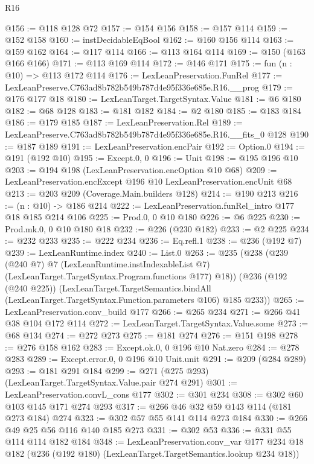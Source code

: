 \begin{lexlean}{R16}
\begin{coremodule}
@156 := @118 @128 @72
@157 := @154 @156
@158 := @157 @114
@159 := @152 @158
@160 := instDecidableEqBool
@162 := @160 @156 @114
@163 := @159 @162
@164 := @117 @114
@166 := @113 @164 @114
@169 := @150 (@163 @166 @166)
@171 := @113 @169 @114
@172 := @146 @171
@175 := fun (n : @10) => @113 @172 @114
@176 := LexLeanPreservation.FunRel
@177 := LexLeanPreserve.C763ad8b782b549b787d4e95f336e685e.R16.__prog
@179 := @176 @177 @18
@180 := LexLeanTarget.TargetSyntax.Value
@181 := @6 @180
@182 := @68 @128
@183 := @181 @182
@184 := @2 @180
@185 := @183 @184
@186 := @179 @185
@187 := LexLeanPreservation.Rel
@189 := LexLeanPreserve.C763ad8b782b549b787d4e95f336e685e.R16.__fits_0 @128
@190 := @187 @189
@191 := LexLeanPreservation.encPair
@192 := Option.{0}
@194 := @191 (@192 @10)
@195 := Except.{0, 0}
@196 := Unit
@198 := @195 @196 @10
@203 := @194 @198 (LexLeanPreservation.encOption @10 @68)
@209 := LexLeanPreservation.encExcept @196 @10 LexLeanPreservation.encUnit @68
@213 := @203 @209 (Coverage.Main.builders @128)
@214 := @190 @213
@216 := (n : @10) -> @186 @214
@222 := LexLeanPreservation.funRel_intro @177 @18 @185 @214 @106
@225 := Prod.{0, 0} @10 @180
@226 := @6 @225
@230 := Prod.mk.{0, 0} @10 @180 @18
@232 := @226 (@230 @182)
@233 := @2 @225
@234 := @232 @233
@235 := @222 @234
@236 := Eq.refl.{1}
@238 := @236 (@192 @7)
@239 := LexLeanRuntime.index
@240 := List.{0}
@263 := @235
    (@238
      (@239
        (@240 @7)
        @7
        (LexLeanRuntime.instIndexableList @7)
        (LexLeanTarget.TargetSyntax.Program.functions @177)
        @18))
    (@236
      (@192 (@240 @225))
      (LexLeanTarget.TargetSemantics.bindAll
        (LexLeanTarget.TargetSyntax.Function.parameters @106)
        @185
        @233))
@265 := LexLeanPreservation.conv_build @177
@266 := @265 @234
@271 := @266 @41 @38 @104 @172 @114
@272 := LexLeanTarget.TargetSyntax.Value.some
@273 := @68 @134
@274 := @272 @273
@275 := @181 @274
@276 := @151 @198
@278 := @276 @158 @162
@283 := Except.ok.{0, 0} @196 @10 Nat.zero
@284 := @278 @283
@289 := Except.error.{0, 0} @196 @10 Unit.unit
@291 := @209 (@284 @289)
@293 := @181 @291 @184
@299 := @271 (@275 @293) (LexLeanTarget.TargetSyntax.Value.pair @274 @291)
@301 := LexLeanPreservation.convL_cons @177
@302 := @301 @234
@308 := @302 @60 @103 @145 @171 @274 @293
@317 := @266 @46 @32 @59 @143 @114 (@181 @273 @184) @274
@323 := @302 @57 @55 @141 @114 @273 @184
@330 := @266 @49 @25 @56 @116 @140 @185 @273
@331 := @302 @53
@336 := @331 @55 @114 @114 @182 @184
@348 := LexLeanPreservation.conv_var
    @177
    @234
    @18
    @182
    (@236 (@192 @180) (LexLeanTarget.TargetSemantics.lookup @234 @18))

\end{coremodule}
\end{lexlean}
